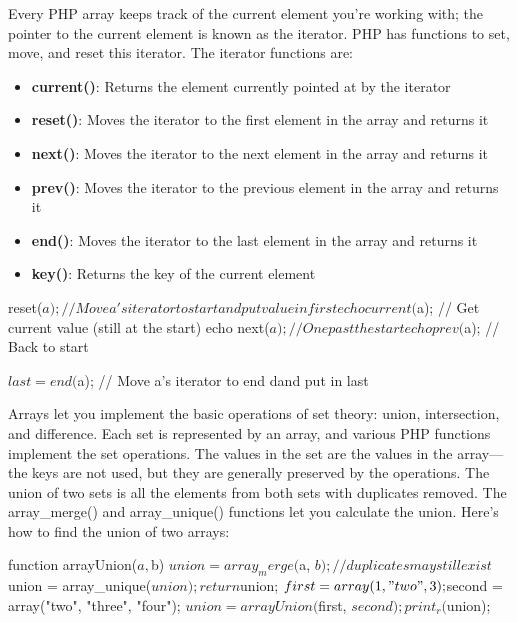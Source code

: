 \documentclass{report}
\begin{document}
\pagebreak 
{}
\bigbreak \noindent 
Every PHP array keeps track of the current element you’re working with; the pointer to the current element is known as the iterator. PHP has functions to set, move, and reset this iterator. The iterator functions are:
\begin{itemize}
    \item \textbf{current()}: Returns the element currently pointed at by the iterator
    \item \textbf{reset()}: Moves the iterator to the first element in the array and returns it
    \item \textbf{next()}: Moves the iterator to the next element in the array and returns it
    \item \textbf{prev()}: Moves the iterator to the previous element in the array and returns it
    \item \textbf{end()}: Moves the iterator to the last element in the array and returns it
    \item \textbf{key()}: Returns the key of the current element
\end{itemize}
\bigbreak \noindent 
\begin{phpcode}
    reset($a); // Move a's iterator to start and put value in first

    echo current($a); // Get current value (still at the start)    
    echo next($a); // One past the start
    echo prev($a); // Back to start

    $last = end($a); // Move a's iterator to end dand put in last
\end{phpcode}

\pagebreak 
{}
\bigbreak \noindent 
Arrays let you implement the basic operations of set theory: union, intersection, and
difference. Each set is represented by an array, and various PHP functions implement
the set operations. The values in the set are the values in the array—the keys are not
used, but they are generally preserved by the operations.
\bigbreak \noindent 
The union of two sets is all the elements from both sets with duplicates removed. The
array\_merge() and array\_unique() functions let you calculate the union. Here’s how
to find the union of two arrays:
\bigbreak \noindent 
\begin{phpcode}
function arrayUnion($a, $b)
{
 $union = array_merge($a, $b); // duplicates may still exist
 $union = array_unique($union);
 return $union;
}
$first = array(1, "two", 3);
$second = array("two", "three", "four");
$union = arrayUnion($first, $second);
print_r($union);
\end{phpcode}
\end{document}
